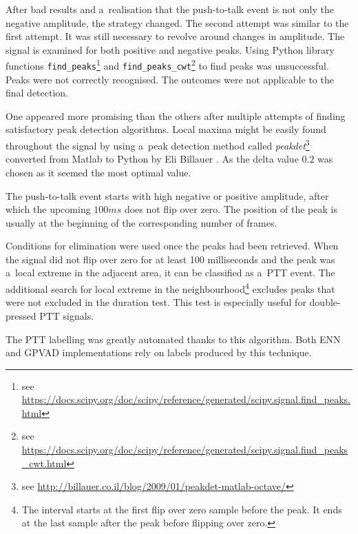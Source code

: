     
    After bad results and a~realisation that the push-to-talk event is not only the negative amplitude, the strategy changed. The second attempt was similar to the first attempt. It was still necessary to revolve around changes in amplitude. The signal is examined for both positive and negative peaks. Using Python library functions \texttt{find\_peaks}\footnote{see \href{https://docs.scipy.org/doc/scipy/reference/generated/scipy.signal.find_peaks.html}{{\selectfont https://docs.scipy.org/doc/scipy/reference/generated/scipy.signal.find\_peaks.html}}} and \texttt{find\_peaks\_cwt}\footnote{see \href{https://docs.scipy.org/doc/scipy/reference/generated/scipy.signal.find_peaks_cwt.html}{{\selectfont https://docs.scipy.org/doc/scipy/reference/generated/scipy.signal.find\_peaks\_cwt.html}}}  to find peaks was unsuccessful. Peaks were not correctly recognised. The outcomes were not applicable to the final detection. 

    One appeared more promising than the others after multiple attempts of finding satisfactory peak detection algorithms. Local maxima might be easily found throughout the signal by using a~peak detection method called \textit{peakdet}\footnote{see \href{http://billauer.co.il/blog/2009/01/peakdet-matlab-octave/}{{\selectfont http://billauer.co.il/blog/2009/01/peakdet-matlab-octave/}}} converted from Matlab to Python by Eli Billauer \cite{peakdet}. As the delta value $0.2$ was chosen as it seemed the most optimal value. 

    The push-to-talk event starts with high negative or positive amplitude, after which the upcoming $100 ms$ does not flip over zero. The position of the peak is usually at the beginning of the corresponding number of frames. 

    Conditions for elimination were used once the peaks had been retrieved. When the signal did not flip over zero for at least 100 milliseconds and the peak was a~local extreme in the adjacent area, it can be classified as a~PTT event. The additional search for local extreme in the neighbourhood\footnote{The interval starts at the first flip over zero sample before the peak. It ends at the last sample after the peak before flipping over zero.} excludes peaks that were not excluded in the duration test. This test is especially useful for double-pressed PTT signals.  
    
    The PTT labelling was greatly automated thanks to this algorithm. Both ENN and GPVAD implementations rely on labels produced by this technique. 
        
